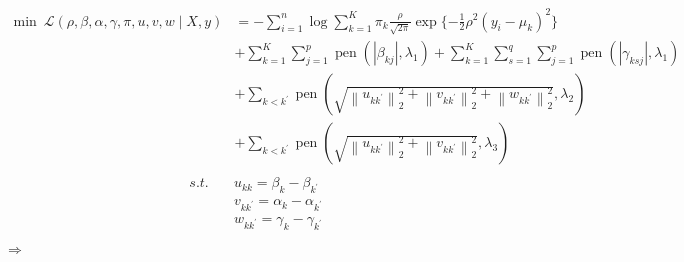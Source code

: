 \documentclass[12pt, a4paper, oneside]{article}
\numberwithin{equation}{section}
\begin{document}
\begin{equation}
	\label{eq:opt-constrain}
	\begin{aligned}
	\operatorname{min}\ \mathcal{L}(\rho, \beta, \alpha, \gamma, \pi , u, v, w\mid X, y)
	&=-\sum_{i=1}^{n} \log \sum_{k=1}^{K} \pi_{k} \frac{\rho}{\sqrt{2\pi}} \exp\{-\frac{1}{2}\rho^2(y_i - \mu_k)^2\} \\
	&+\sum_{k=1}^{K} \sum_{j=1}^{p} \operatorname{pen}\left(\left|\beta_{kj}\right|, \lambda_{1}\right)+\sum_{k=1}^{K} \sum_{s=1}^{q} \sum_{j=1}^{p} \operatorname{pen}\left(\left|\gamma_{ksj}\right|, \lambda_{1}\right) \\
	&+\sum_{k<k^{\prime}} \operatorname{pen}\left(\sqrt{\left\|u_{k{k^\prime}}\right\|_{2}^{2}+\left\|v_{k{k^\prime}}\right\|_{2}^{2}+\left\|w_{k{k^\prime}}\right\|_{2}^{2}}, \lambda_{2}\right) \\
	&+\sum_{k<k^{\prime}} \operatorname{pen}\left(\sqrt{\left\|u_{k{k^\prime}}\right\|_{2}^{2}+\left\|v_{k{k^\prime}}\right\|_{2}^{2}}, \lambda_{3}\right) \\
	\end{aligned}
\end{equation}
\begin{equation}
	\begin{aligned}
		s.t. \quad & u_{kk} = \beta_k - \beta_{k^\prime} \\
		& v_{k{k^\prime}} = \alpha_k -\alpha_{k^\prime} \\
		& w_{k{k^\prime}} = \gamma_k - \gamma_{k^\prime} \\
	\end{aligned}
	\nonumber
\end{equation}
$\Rightarrow$
\end{document}
